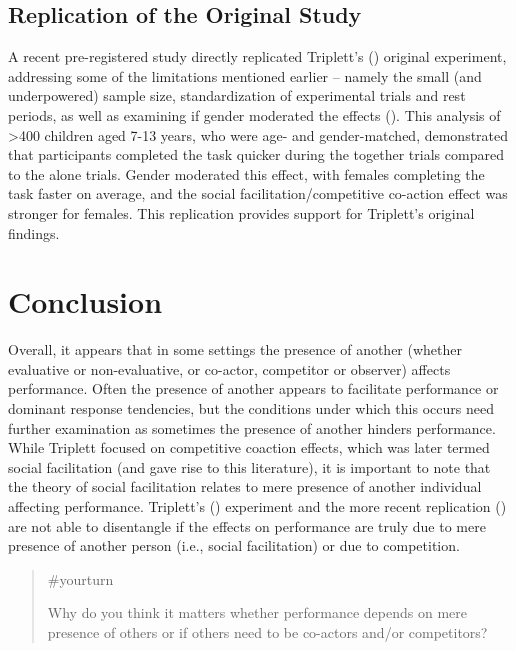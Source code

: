 \documentclass[
  letterpaper,
]{book}
\begin{document}
\subsection{Replication of the Original
Study}\label{replication-of-the-original-study}

A recent pre-registered study directly replicated Triplett's
() original experiment, addressing
some of the limitations mentioned earlier -- namely the small (and
underpowered) sample size, standardization of experimental trials and
rest periods, as well as examining if gender moderated the effects
(). This analysis
of \textgreater400 children aged 7-13 years, who were age- and
gender-matched, demonstrated that participants completed the task
quicker during the together trials compared to the alone trials. Gender
moderated this effect, with females completing the task faster on
average, and the social facilitation/competitive co-action effect was
stronger for females. This replication provides support for Triplett's
original findings.

\section{Conclusion}\label{conclusion-9}

Overall, it appears that in some settings the presence of another
(whether evaluative or non-evaluative, or co-actor, competitor or
observer) affects performance. Often the presence of another appears to
facilitate performance or dominant response tendencies, but the
conditions under which this occurs need further examination as sometimes
the presence of another hinders performance. While Triplett focused on
competitive coaction effects, which was later termed social facilitation
(and gave rise to this literature), it is important to note that the
theory of social facilitation relates to mere presence of another
individual affecting performance. Triplett's
() experiment and the more recent
replication () are
not able to disentangle if the effects on performance are truly due to
mere presence of another person (i.e., social facilitation) or due to
competition.

\begin{quote}
{\#yourturn}

Why do you think it matters whether performance depends on mere presence
of others or if others need to be co-actors and/or competitors?
\end{quote}
\end{document}
